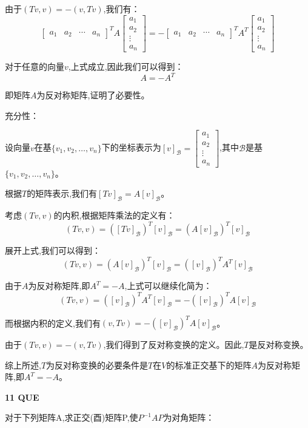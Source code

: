 \documentclass[11pt,letterpaper]{ctexart}
\begin{document}
\begin{enumerate}
由于$(Tv, v) = -(v, Tv)$,我们有：
\[\begin{bmatrix} a_1 & a_2 & \cdots & a_n \end{bmatrix}^T A \begin{bmatrix} a_1 \\ a_2 \\ \vdots \\ a_n \end{bmatrix} = -\begin{bmatrix} a_1 & a_2 & \cdots & a_n \end{bmatrix}^T A^T \begin{bmatrix} a_1 \\ a_2 \\ \vdots \\ a_n \end{bmatrix}\]

对于任意的向量$v$,上式成立,因此我们可以得到：
\[A = -A^T\]

即矩阵$A$为反对称矩阵,证明了必要性。

充分性：

设向量$v$在基$\{v_1, v_2, \ldots, v_n\}$下的坐标表示为$[v]_\mathcal{B} = \begin{bmatrix} a_1 \\ a_2 \\ \vdots \\ a_n \end{bmatrix}$,其中$\mathcal{B}$是基$\{v_1, v_2, \ldots, v_n\}$。

根据$T$的矩阵表示,我们有$[Tv]_\mathcal{B} = A[v]_\mathcal{B}$。

考虑$(Tv, v)$的内积,根据矩阵乘法的定义有：
\[(Tv, v) = ([Tv]_\mathcal{B})^T [v]_\mathcal{B} = (A[v]_\mathcal{B})^T [v]_\mathcal{B}\]

展开上式,我们可以得到：
\[(Tv, v) = (A[v]_\mathcal{B})^T [v]_\mathcal{B} = ([v]_\mathcal{B})^T A^T [v]_\mathcal{B}\]

由于$A$为反对称矩阵,即$A^T = -A$,上式可以继续化简为：
\[(Tv, v) = ([v]_\mathcal{B})^T A^T [v]_\mathcal{B} = -([v]_\mathcal{B})^T A [v]_\mathcal{B}\]

而根据内积的定义,我们有$(v, Tv) = -([v]_\mathcal{B})^T A [v]_\mathcal{B}$。

由于$(Tv, v) = -(v, Tv)$,我们得到了反对称变换的定义。因此,$T$是反对称变换。

综上所述,$T$为反对称变换的必要条件是$T$在$V$的标准正交基下的矩阵$A$为反对称矩阵,即$A^T = -A$。

\textbf{11 QUE}
\bigskip

对于下列矩阵A,求正交(酉)矩阵P,使$P^{-1}AP$为对角矩阵：


\end{enumerate}
\end{document}
